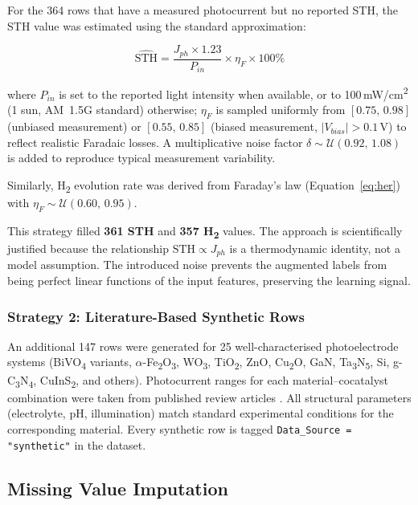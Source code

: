 For the 364 rows that have a measured photocurrent but no reported STH,
the STH value was estimated using the standard approximation:

\begin{equation}
  \widehat{\text{STH}} = \frac{J_{ph} \times 1.23}{P_{in}} \times \eta_F \times 100\%
  \label{eq:sth_est}
\end{equation}

where $P_{in}$ is set to the reported light intensity when available,
or to 100\,mW/cm\textsuperscript{2} (1 sun, AM~1.5G standard) otherwise;
$\eta_F$ is sampled uniformly from $[0.75,\,0.98]$ (unbiased measurement) or
$[0.55,\,0.85]$ (biased measurement, $|V_{bias}| > 0.1$\,V) to reflect realistic
Faradaic losses.
A multiplicative noise factor $\delta \sim \mathcal{U}(0.92,\,1.08)$ is added
to reproduce typical measurement variability.

Similarly, H\textsubscript{2} evolution rate was derived from Faraday's law
(Equation~\ref{eq:her}) with $\eta_F \sim \mathcal{U}(0.60,\,0.95)$.

This strategy filled \textbf{361 STH} and \textbf{357 H\textsubscript{2}} values.
The approach is scientifically justified because the relationship
$\text{STH} \propto J_{ph}$ is a thermodynamic identity, not a model assumption.
The introduced noise prevents the augmented labels from being perfect linear
functions of the input features, preserving the learning signal.

\subsubsection{Strategy 2: Literature-Based Synthetic Rows}

An additional 147 rows were generated for 25 well-characterised photoelectrode
systems (BiVO\textsubscript{4} variants, $\alpha$-Fe\textsubscript{2}O\textsubscript{3},
WO\textsubscript{3}, TiO\textsubscript{2}, ZnO, Cu\textsubscript{2}O, GaN,
Ta\textsubscript{3}N\textsubscript{5}, Si, g-C\textsubscript{3}N\textsubscript{4},
CuInS\textsubscript{2}, and others).
Photocurrent ranges for each material--cocatalyst combination were taken from
published review articles \cite{dias2016recent,tamirat2016using}.
All structural parameters (electrolyte, pH, illumination) match standard
experimental conditions for the corresponding material.
Every synthetic row is tagged \texttt{Data\_Source = "synthetic"} in the dataset.

\subsection{Missing Value Imputation}

